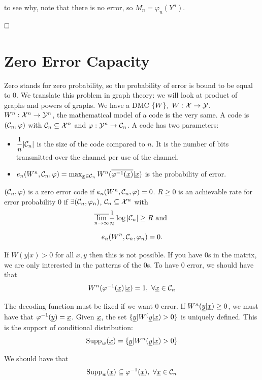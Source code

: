 to see why, note that there is no error, so $M_n = \varphi_n(Y^n).$

$\hfill\Box$

\section{Zero Error Capacity}
Zero stands for zero probability, so the probability of error is bound to be equal to 0. We translate this problem in graph theory: we will look
at product of graphs and powers of graphs. We have a DMC $\{W\},\ W:\mathcal{X} \rightarrow \mathcal{Y}$. $W^n:\mathcal{X}^n \rightarrow \mathcal{Y}^n$, the mathematical model of a code is the very same. A code is $(\mathcal{C}_n, \varphi)$ with $\mathcal{C}_n \subseteq \mathcal{X}^n$ and $\varphi: \mathcal{Y}^n \rightarrow \mathcal{C}_n$. A code has two parameters:

\begin{itemize}
	\item $\dfrac{1}{n}|\mathcal{C}_n|$ is the size of the code compared to $n$. It is the number of bits transmitted over the channel per use of the channel.
	\item $e_n(W^n, \mathcal{C}_n, \varphi) = \max_{\underline{x} \in \mathcal{C}_n} W^n(\overline{\varphi^{-1}(\underline{x})}|\underline{x})$ is the probability of error.
\end{itemize}

$(\mathcal{C}_n, \varphi)$ is a zero error code if $e_n(W^n, \mathcal{C}_n, \varphi)=0$. $R \geq 0$ is an achievable rate for error probability $0$ if $\exists (\mathcal{C}_n, \varphi_n)$, $\mathcal{C}_n \subseteq \mathcal{X}^n$ with
\[
\overline{\lim_{n \rightarrow \infty}} \dfrac{1}{n}\log|\mathcal{C}_n| \geq R\text{ and }
\]

\[
e_n(W^n, \mathcal{C}_n, \varphi_n) = 0.
\]

If $W(y|x) > 0$ for all $x, y$ then this is not possible. If you have 0s in the matrix, we are only interested in the patterns of the 0s. To have 0 error, we should have that
\[
W^n(\varphi^{-1}(\underline{x})|\underline{x}) = 1,\ \forall\underline{x} \in \mathcal{C}_n
\]

The decoding function must be fixed if we want $0$ error. If $W^n(\underline{y}|\underline{x}) \geq 0$, we must have that $\varphi^{-1}(\underline{y}) = \underline{x}$. Given $\underline{x}$, the set $\{\underline{y}| W^(\underline{y}|\underline{x})>0 \}$ is uniquely defined. This is the support of conditional distribution:
\begin{equation}
\text{Supp}_w(\underline{x}) = \{\underline{y}| W^n(\underline{y}|\underline{x})>0 \}
\end{equation}

We should have that 
\[
\text{Supp}_w(\underline{x}) \subseteq \varphi^{-1}(\underline{x}),\ \forall\underline{x} \in \mathcal{C}_n
\]

